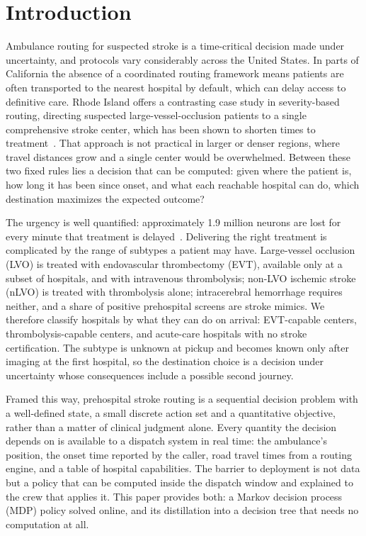 \section{Introduction}

Ambulance routing for suspected stroke is a time-critical decision made under uncertainty, and protocols vary considerably across the United States. In parts of California the absence of a coordinated routing framework means patients are often transported to the nearest hospital by default, which can delay access to definitive care. Rhode Island offers a contrasting case study in severity-based routing, directing suspected large-vessel-occlusion patients to a single comprehensive stroke center, which has been shown to shorten times to treatment~\cite{jayaraman2023}. That approach is not practical in larger or denser regions, where travel distances grow and a single center would be overwhelmed. Between these two fixed rules lies a decision that can be computed: given where the patient is, how long it has been since onset, and what each reachable hospital can do, which destination maximizes the expected outcome?

The urgency is well quantified: approximately 1.9 million neurons are lost for every minute that treatment is delayed~\cite{saver2006}. Delivering the right treatment is complicated by the range of subtypes a patient may have. Large-vessel occlusion (LVO) is treated with endovascular thrombectomy (EVT), available only at a subset of hospitals, and with intravenous thrombolysis; non-LVO ischemic stroke (nLVO) is treated with thrombolysis alone; intracerebral hemorrhage requires neither, and a share of positive prehospital screens are stroke mimics. We therefore classify hospitals by what they can do on arrival: EVT-capable centers, thrombolysis-capable centers, and acute-care hospitals with no stroke certification. The subtype is unknown at pickup and becomes known only after imaging at the first hospital, so the destination choice is a decision under uncertainty whose consequences include a possible second journey.

Framed this way, prehospital stroke routing is a sequential decision problem with a well-defined state, a small discrete action set and a quantitative objective, rather than a matter of clinical judgment alone. Every quantity the decision depends on is available to a dispatch system in real time: the ambulance's position, the onset time reported by the caller, road travel times from a routing engine, and a table of hospital capabilities. The barrier to deployment is not data but a policy that can be computed inside the dispatch window and explained to the crew that applies it. This paper provides both: a Markov decision process (MDP) policy solved online, and its distillation into a decision tree that needs no computation at all.

